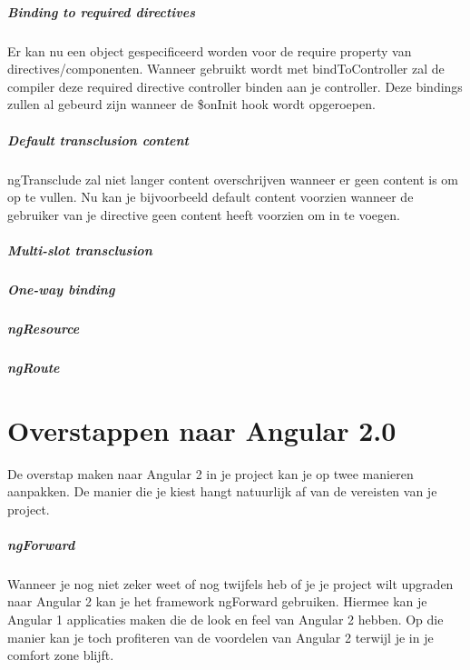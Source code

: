 \documentclass[pdftex,a4paper,12pt,twoside]{report}
\begin{document}
\paragraph{Binding to required directives}
\leavevmode
\newline
Er kan nu een object gespecificeerd worden voor de require property van directives/componenten. Wanneer gebruikt wordt met bindToController zal de compiler deze required directive controller binden aan je controller. Deze bindings zullen al gebeurd zijn wanneer de \$onInit hook wordt opgeroepen.

\paragraph{Default transclusion content}
\leavevmode
\newline
ngTransclude zal niet langer content overschrijven wanneer er geen content is om op te vullen. Nu kan je bijvoorbeeld default content voorzien wanneer de gebruiker van je directive geen content heeft voorzien om in te voegen.

\paragraph{Multi-slot transclusion}
\paragraph{One-way binding}
\paragraph{ngResource}
\paragraph{ngRoute}

\chapter{Overstappen naar Angular 2.0}
\label{ch:conclusie}
De overstap maken naar Angular 2 in je project kan je op twee manieren aanpakken. De manier die je kiest hangt natuurlijk af van de vereisten van je project. 
\linebreak
{}

\paragraph{ngForward}
Wanneer je nog niet zeker weet of nog twijfels heb of je je project wilt upgraden naar Angular 2 kan je het framework ngForward gebruiken. Hiermee kan je Angular 1 applicaties maken die de look en feel van Angular 2 hebben. Op die manier kan je toch profiteren van de voordelen van Angular 2 terwijl je in je comfort zone blijft.
\end{document}
